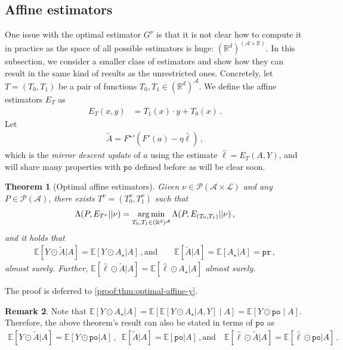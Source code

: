 \documentclass{article}
\theoremstyle{plain}
\newtheorem{theorem}{Theorem}
\theoremstyle{definition}
\newtheorem{remark}[theorem]{Remark}
\newcommand{\pr}{\texttt{pr}}
\newcommand{\po}{\texttt{po}}
\newcommand{\R}{\mathbb R}
\newcommand{\Rd}{\mathbb{R}^d}
\newcommand{\argmin}{\operatornamewithlimits{arg\,min}}
\newcommand{\E}{\mathbb E}
\newcommand{\cL}{\mathcal L}
\newcommand{\cA}{\mathcal A}
\newcommand{\cP}{\mathcal P}
\newcommand{\hl}{\hat{\ell}\xspace}
\begin{document}
\subsection{Affine estimators}
One issue with the optimal estimator $G^\nu$ is that
it is not clear how to compute it in practice as
the space of all possible estimators is huge: $(\Rd)^{(\cA \times \R)}$.
In this subsection, we consider a smaller class of estimators
and show how they can result in the same kind of results as the unrestricted ones.
Concretely, let $T = (T_0, T_1)$ be a pair of functions $T_0, T_1 \in (\R^{d})^{\cA}$.
We define the affine estimators $E_T$ as
\begin{align*}
    E_T(x,y) & = T_1(x) \cdot y + T_0(x)\,.
\end{align*}
Let
\begin{align*}
    \tilde{A} = {F^\star}'(F'(a) - \eta \hl)\,,
\end{align*}
which is the \textit{mirror descent update} of $a$ using
the estimate $\hl = E_T(A, Y)$, and will share many properties
with $\po$ defined before as will be clear soon.
\begin{theorem}[Optimal affine estimators]
    \label{thm:optimal-affine-y}
    Given $\nu \in \cP(\cA \times \cL)$ and any $P \in \cP(\cA)$,
    there exists $T^\nu = (T_0^\nu, T_1^\nu)$ such that
    \begin{align*}
        \Lambda(P, E_{T^{\nu}}|| \nu) =
        \argmin_{T_0, T_1 \in (\Rd)^\cA}
        \Lambda(P, E_{(T_0, T_1)}|| \nu)\,,
    \end{align*}
    and it holds that
    \begin{align}
        \E\!\left[
            Y \odot \tilde{A}
            | A
            \right]
        =
        \E\!\left[
            Y \odot A_\star
            | A
            \right]
        \,,
        \text{and}
        \qquad
        \E[
            \tilde{A}
            | A
        ]
        =
        \E[
            A_\star
            | A
        ]=
        \pr\,,
        \label{eq:affine-E-opt}
    \end{align}
    almost surely.
    Further, $\E\left[\hl \odot \tilde{A}| A\right] = \E\left[\hl \odot A_\star | A\right]$ almost surely.
\end{theorem}
\noindent The proof is deferred to \ref{proof:thm:optimal-affine-y}.
\begin{remark}
    Note that $\E[Y \odot A_\star | A] =
        \E[ \E[Y \odot A_\star |A,Y] \mid A] = \E[Y \odot \po \mid A]$.
    Therefore, the above theorem's result can also be stated in terms of
    $\po$ as
    \begin{align}
        \E\!\left[
            Y \odot \tilde{A}
            | A
            \right]
        =
        \E\!\left[
            Y \odot \po
            | A
            \right]
        \,,
        \,\,\,
        \E[
            \tilde{A}
            | A
        ]
        =
        \E\!\left[
            \po
            | A
            \right]\,,
        \text{and}
        \quad
        \E\left[\hl \odot \tilde{A}| A\right] = \E\left[\hl \odot \po | A\right]\,.
        \label{eq:affine-E-opt-po}
    \end{align}
\end{remark}
\end{document}

